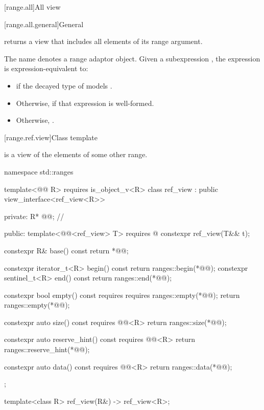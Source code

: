 [range.all]{All view}

[range.all.general]{General}

\pnum
{}%
 returns a view that includes all elements of
its range argument.

\pnum
The name  denotes a
range adaptor object.
Given a subexpression , the expression
 is expression-equivalent to:
\begin{itemize}
\item {} if the decayed type of 
models .

\item Otherwise,  if that expression is well-formed.

\item Otherwise, .
\end{itemize}

[range.ref.view]{Class template }

\pnum
{} is a view of the elements of some other range.
%
\begin{codeblock}
namespace std::ranges {
  template<@@ R>
    requires is_object_v<R>
  class ref_view : public view_interface<ref_view<R>> {
  private:
    R* @@;                      // \expos

  public:
    template<@@<ref_view> T>
      requires @\seebelow@
    constexpr ref_view(T&& t);

    constexpr R& base() const { return *@@; }

    constexpr iterator_t<R> begin() const { return ranges::begin(*@@); }
    constexpr sentinel_t<R> end() const { return ranges::end(*@@); }

    constexpr bool empty() const
      requires requires { ranges::empty(*@@); }
    { return ranges::empty(*@@); }

    constexpr auto size() const requires @@<R>
    { return ranges::size(*@@); }

    constexpr auto reserve_hint() const requires @@<R>
    { return ranges::reserve_hint(*@@); }

    constexpr auto data() const requires @@<R>
    { return ranges::data(*@@); }
  };

  template<class R>
    ref_view(R&) -> ref_view<R>;
}
\end{codeblock}

